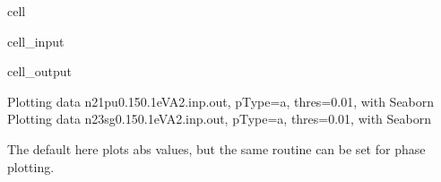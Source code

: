 \documentclass[letterpaper,10pt,english]{jupyterBook}
\begin{document}
\begin{sphinxuseclass}{cell}\begin{sphinxVerbatimInput}

\begin{sphinxuseclass}{cell_input}
\begin{sphinxVerbatim}[commandchars=\\\{\}]
\end{sphinxVerbatim}

\end{sphinxuseclass}\end{sphinxVerbatimInput}
\begin{sphinxVerbatimOutput}

\begin{sphinxuseclass}{cell_output}
\begin{sphinxVerbatim}[commandchars=\\\{\}]
Plotting data n2\PYGZus{}1pu\PYGZus{}0.1\PYGZhy{}50.1eV\PYGZus{}A2.inp.out, pType=a, thres=0.01, with Seaborn
Plotting data n2\PYGZus{}3sg\PYGZus{}0.1\PYGZhy{}50.1eV\PYGZus{}A2.inp.out, pType=a, thres=0.01, with Seaborn
\end{sphinxVerbatim}

\noindent{}

\noindent{}

\end{sphinxuseclass}\end{sphinxVerbatimOutput}

\end{sphinxuseclass}
\sphinxAtStartPar
The default here plots abs values, but the same routine can be set for phase plotting.
\end{document}
